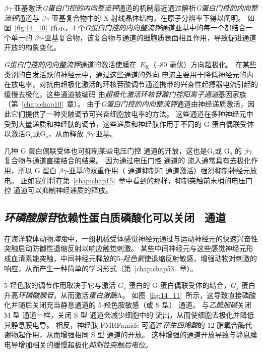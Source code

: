 $\beta \gamma$-亚基激活\textit{G蛋白门控的内向整流钾}通道的机制最近通过解析\textit{G蛋白门控的内向整流钾}通道与 $\beta \gamma$-亚基复合物中的 X 射线晶体结构，在原子分辨率下得以阐明。
如图~\ref{fig:14_10}~所示，4 个\textit{G蛋白门控的内向整流钾}通道亚基中的每一个都结合一个单一的 $\beta \gamma$-亚基复合物，该复合物与通道的细胞质表面相互作用，导致促进通道开放的构象变化。


\textit{G蛋白门控的内向整流钾}通道的激活使膜在~$E_\text{K}$（–80 毫伏）方向超极化。
在某些类别的自发活跃的神经元中，通过这些通道的外向  电流主要用于降低神经元的内在放电率，对抗由超极化激活的环核苷酸调节通道携带的兴奋性起搏器电流引起的缓慢去极化，这些通道被编码 由\textit{超极化激活环核苷酸门控阳离子通道}基因家族（第~\ref{chap:chap10}~章）。
由于\textit{G蛋白门控的内向整流钾}通道由神经递质激活，因此它们提供了一种突触调节可兴奋细胞放电率的方法。
这些通道在多种神经元中受到大量递质和神经肽的调节，这些递质和神经肽作用于不同的 G 蛋白偶联受体以激活G\textit{$_i $}或G$_o$，从而释放 $\beta \gamma$ 亚基。


几种 G 蛋白偶联受体也可抑制某些电压门控  通道的开放，这也是G\textit{$_i $}或 G$_o$ 的 $\beta \gamma$ 复合物与通道直接结合的结果。
因为通过电压门控  通道的  流入通常具有去极化作用，所以 G 蛋白 $\beta \gamma$-亚基的双重作用（ 通道抑制和  通道激活）强烈抑制神经元放电。
正如我们将在第~\ref{chap:chap15}~章中看到的那样，抑制突触前末梢的电压门控  通道可以抑制神经递质的释放。



\subsection{\textit{环磷酸腺苷}依赖性蛋白质磷酸化可以关闭~ 通道}

在海洋软体动物\textit{海兔}中，一组机械受体感觉神经元通过与运动神经元的快速兴奋性突触启动防御性退缩反射以响应触觉刺激。
某些中间神经元与这些感觉神经元形成血清素能突触，中间神经元释放的5\textit{-羟色氨}使退缩反射敏感，增强动物对刺激的响应，从而产生一种简单的学习形式（第~\ref{chap:chap53}~章）。


5-羟色胺的调节作用取决于它与激活 $ G_s $ 蛋白的 G 蛋白偶联受体的结合，$ G_s $ 蛋白升高\textit{环磷酸腺苷}，从而激活\textit{蛋白激酶}A。
如图~\ref{fig:14_11}~所示，这导致直接磷酸化并随后关闭充当静息通道的 5-羟色胺敏感（或 S 型） 通道。
与\textit{乙酰胆碱}关闭 M 型  通道一样，关闭 S 型  通道会减少细胞中的  流出，从而使细胞去极化并降低其静息膜电导。
相反，神经肽 FMRFamide 可通过\textit{花生四烯酸}的 12-脂氧合酶代谢物起作用，从而增强相同 S 型  通道的开放。
这种增强的通道开放导致与静息膜电导增加相关的缓慢超极化\textit{抑制性突触后电位}。


